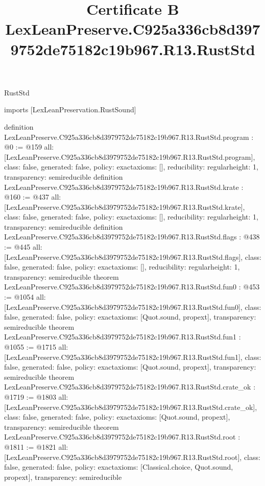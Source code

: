 \begin{lexlean}{RustStd}
\title{Certificate B LexLeanPreserve.C925a336cb8d3979752de75182c19b967.R13.RustStd}
\begin{coremodule}
imports [LexLeanPreservation.RustSound]

definition LexLeanPreserve.C925a336cb8d3979752de75182c19b967.R13.RustStd.program : @0 := @159 {
  all: [LexLeanPreserve.C925a336cb8d3979752de75182c19b967.R13.RustStd.program],
  class: false,
  generated: false,
  policy: exact{axioms: []},
  reducibility: regular{height: 1},
  transparency: semireducible
}
definition LexLeanPreserve.C925a336cb8d3979752de75182c19b967.R13.RustStd.krate : @160 := @437 {
  all: [LexLeanPreserve.C925a336cb8d3979752de75182c19b967.R13.RustStd.krate],
  class: false,
  generated: false,
  policy: exact{axioms: []},
  reducibility: regular{height: 1},
  transparency: semireducible
}
definition LexLeanPreserve.C925a336cb8d3979752de75182c19b967.R13.RustStd.flags : @438 := @445 {
  all: [LexLeanPreserve.C925a336cb8d3979752de75182c19b967.R13.RustStd.flags],
  class: false,
  generated: false,
  policy: exact{axioms: []},
  reducibility: regular{height: 1},
  transparency: semireducible
}
theorem LexLeanPreserve.C925a336cb8d3979752de75182c19b967.R13.RustStd.fun0 : @453 := @1054 {
  all: [LexLeanPreserve.C925a336cb8d3979752de75182c19b967.R13.RustStd.fun0],
  class: false,
  generated: false,
  policy: exact{axioms: [Quot.sound, propext]},
  transparency: semireducible
}
theorem LexLeanPreserve.C925a336cb8d3979752de75182c19b967.R13.RustStd.fun1 : @1055 := @1715 {
  all: [LexLeanPreserve.C925a336cb8d3979752de75182c19b967.R13.RustStd.fun1],
  class: false,
  generated: false,
  policy: exact{axioms: [Quot.sound, propext]},
  transparency: semireducible
}
theorem LexLeanPreserve.C925a336cb8d3979752de75182c19b967.R13.RustStd.crate_ok : @1719 := @1803 {
  all: [LexLeanPreserve.C925a336cb8d3979752de75182c19b967.R13.RustStd.crate_ok],
  class: false,
  generated: false,
  policy: exact{axioms: [Quot.sound, propext]},
  transparency: semireducible
}
theorem LexLeanPreserve.C925a336cb8d3979752de75182c19b967.R13.RustStd.root : @1811 := @1821 {
  all: [LexLeanPreserve.C925a336cb8d3979752de75182c19b967.R13.RustStd.root],
  class: false,
  generated: false,
  policy: exact{axioms: [Classical.choice, Quot.sound, propext]},
  transparency: semireducible
}


\end{coremodule}
\end{lexlean}

